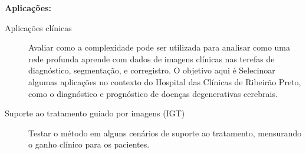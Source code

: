 \documentclass[
	12pt,				%
	openany,oneside,
	a4paper,			%
	english,			%
	brazil,				%
	]{abntex2}
\begin{document}
\textbf{Aplicações:}
\begin{description}
\item[Aplicações clínicas] Avaliar como a complexidade pode ser utilizada para analisar como uma rede profunda aprende com dados de imagens clínicas nas terefas de diagnóstico, segmentação, e corregistro. O objetivo aqui é Selecinoar algumas aplicações no contexto do  Hospital das Clínicas de Ribeirão Preto, como o diagnóstico e prognóstico de doenças degenerativas cerebrais.
\item[Suporte ao tratamento guiado por imagens (IGT)] Testar o método em alguns cenários de suporte ao tratamento, mensurando o ganho clínico para os pacientes.  
\end{description}


\begin{figure}


\end{figure}
\end{document}
